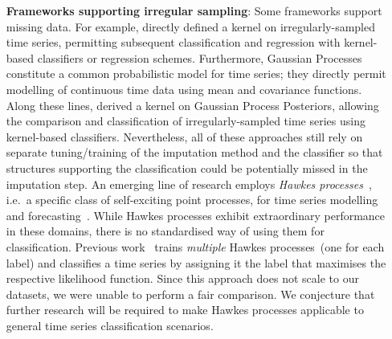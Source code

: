 \documentclass{article}
\begin{document}
\begin{enumerate}[nosep, parsep=0.5em, labelindent=0em, itemsep=0em,
  align=left, labelwidth=*, leftmargin=0em]
\item[\textbf{Frameworks supporting irregular sampling}:]
Some frameworks support missing data. For example,
\citet{lu2008reproducing} directly defined a kernel on
irregularly-sampled time series, permitting subsequent classification
and regression with kernel-based classifiers or regression schemes.
Furthermore, Gaussian Processes~\citep{williams2006gaussian} constitute
a common probabilistic model for time series; they directly permit
modelling of continuous time data using mean and covariance functions.
Along these lines, \citet{li2015classification} derived
a kernel on Gaussian Process Posteriors, allowing the comparison and
classification of irregularly-sampled time series using
kernel-based classifiers.
Nevertheless, all of these approaches still rely on separate
tuning/training of the imputation method and the classifier so that
structures supporting the classification could be potentially missed in
the imputation step.
An emerging line of research employs \emph{Hawkes
processes}~\citep{Hawkes71, Liniger09}, i.e.\ a specific class of self-exciting
point processes, for time series modelling and
forecasting~\citep{Mei17, Yang17, Xiao17}.
While Hawkes processes exhibit extraordinary performance in these
domains, there is no standardised way of using them for classification.
Previous work~\citep{Lukasik16} trains \emph{multiple} Hawkes
processes~(one for each label) and classifies a time series by assigning
it the label that maximises the respective likelihood function. Since
this approach does not scale to our datasets, we were unable to perform
a fair comparison.  We conjecture that further research will be required
to make Hawkes processes applicable to general time series
classification scenarios.


\end{enumerate}
\end{document}

